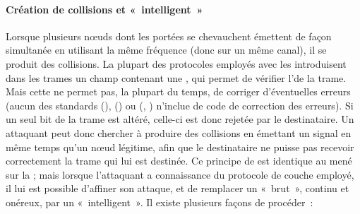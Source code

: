 \paragraph{Création de collisions et  « intelligent »}
Lorsque plusieurs nœuds dont les portées se chevauchent émettent de façon simultanée en utilisant la même fréquence (donc sur un même canal), il se produit des collisions.
La plupart des protocoles \mac employés avec les \rcs introduisent dans les trames un champ contenant une , qui permet de vérifier l'\integrite de la trame.
Mais cette  ne permet pas, la plupart du temps, de corriger d'éventuelles erreurs (aucun des standards \ieeee (\wifi), \ieeefo (\bluetooth) ou \ieeeff (\zigbee, \slowpan) n'inclue de code de correction des erreurs).
Si un seul bit de la trame est altéré, celle-ci est donc rejetée par le destinataire.
Un attaquant peut donc chercher à produire des collisions en émettant un signal en même temps qu'un nœud légitime, afin que le destinataire ne puisse pas recevoir correctement la trame qui lui est destinée.
Ce principe de  est identique au  mené sur la ; mais lorsque l'attaquant a connaissance du protocole de couche \mac{} employé, il lui est possible d'affiner son attaque, et de remplacer un  « brut », continu et onéreux, par un  « intelligent ».
Il existe plusieurs façons de procéder~\cite{PI11}:
